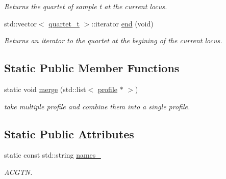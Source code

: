 \begin{DoxyCompactItemize}
\begin{DoxyCompactList}\small\item\em Returns the quartet of sample t at the current locus. \end{DoxyCompactList}\item 
\hypertarget{classprofile_a5a833f4d840a4afc764602ee11a5f905}{std\-::vector$<$ \hyperlink{structquartet}{quartet\-\_\-t} $>$\-::iterator \hyperlink{classprofile_a5a833f4d840a4afc764602ee11a5f905}{end} (void)}\label{classprofile_a5a833f4d840a4afc764602ee11a5f905}

\begin{DoxyCompactList}\small\item\em Returns an iterator to the quartet at the begining of the current locus. \end{DoxyCompactList}\end{DoxyCompactItemize}
\subsection*{Static Public Member Functions}
\begin{DoxyCompactItemize}
\item 
\hypertarget{classprofile_afcb4eaf9094258e1399ded1386caa73e}{static void \hyperlink{classprofile_afcb4eaf9094258e1399ded1386caa73e}{merge} (std\-::list$<$ \hyperlink{classprofile}{profile} $\ast$ $>$)}\label{classprofile_afcb4eaf9094258e1399ded1386caa73e}

\begin{DoxyCompactList}\small\item\em take multiple profile and combine them into a single profile. \end{DoxyCompactList}\end{DoxyCompactItemize}
\subsection*{Static Public Attributes}
\begin{DoxyCompactItemize}
\item 
\hypertarget{classprofile_a3d781f0fa1b05161fdcc623667fa66ea}{static const std\-::string \hyperlink{classprofile_a3d781f0fa1b05161fdcc623667fa66ea}{names\-\_\-}}\label{classprofile_a3d781f0fa1b05161fdcc623667fa66ea}

\begin{DoxyCompactList}\small\item\em A\-C\-G\-T\-N. \end{DoxyCompactList}\end{DoxyCompactItemize}
